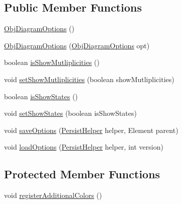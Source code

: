 \subsection*{Public Member Functions}
\begin{DoxyCompactItemize}
\item 
\hyperlink{classorg_1_1tzi_1_1use_1_1gui_1_1views_1_1diagrams_1_1objectdiagram_1_1_obj_diagram_options_addb90915073c67b043c6b73b29da1279}{Obj\-Diagram\-Options} ()
\item 
\hyperlink{classorg_1_1tzi_1_1use_1_1gui_1_1views_1_1diagrams_1_1objectdiagram_1_1_obj_diagram_options_a6ea32929afcb109c3407174860d71ddf}{Obj\-Diagram\-Options} (\hyperlink{classorg_1_1tzi_1_1use_1_1gui_1_1views_1_1diagrams_1_1objectdiagram_1_1_obj_diagram_options}{Obj\-Diagram\-Options} opt)
\item 
boolean \hyperlink{classorg_1_1tzi_1_1use_1_1gui_1_1views_1_1diagrams_1_1objectdiagram_1_1_obj_diagram_options_a71dbe252858720024859df34b5e86725}{is\-Show\-Mutliplicities} ()
\item 
void \hyperlink{classorg_1_1tzi_1_1use_1_1gui_1_1views_1_1diagrams_1_1objectdiagram_1_1_obj_diagram_options_a9e06187a385b7f14a2011060597c7819}{set\-Show\-Mutliplicities} (boolean show\-Mutliplicities)
\item 
boolean \hyperlink{classorg_1_1tzi_1_1use_1_1gui_1_1views_1_1diagrams_1_1objectdiagram_1_1_obj_diagram_options_a25db1b9e788d7ea31d926c1d6ed74e5f}{is\-Show\-States} ()
\item 
void \hyperlink{classorg_1_1tzi_1_1use_1_1gui_1_1views_1_1diagrams_1_1objectdiagram_1_1_obj_diagram_options_acb91b7218f9450ce310e9effc801311e}{set\-Show\-States} (boolean is\-Show\-States)
\item 
void \hyperlink{classorg_1_1tzi_1_1use_1_1gui_1_1views_1_1diagrams_1_1objectdiagram_1_1_obj_diagram_options_a176bcd8a82f2c8768e134767d28853ea}{save\-Options} (\hyperlink{classorg_1_1tzi_1_1use_1_1gui_1_1util_1_1_persist_helper}{Persist\-Helper} helper, Element parent)
\item 
void \hyperlink{classorg_1_1tzi_1_1use_1_1gui_1_1views_1_1diagrams_1_1objectdiagram_1_1_obj_diagram_options_a41ecd87e5bb7861acda41524b716fb0f}{load\-Options} (\hyperlink{classorg_1_1tzi_1_1use_1_1gui_1_1util_1_1_persist_helper}{Persist\-Helper} helper, int version)
\end{DoxyCompactItemize}
\subsection*{Protected Member Functions}
\begin{DoxyCompactItemize}
\item 
void \hyperlink{classorg_1_1tzi_1_1use_1_1gui_1_1views_1_1diagrams_1_1objectdiagram_1_1_obj_diagram_options_a40d9c942ad0d91d25b7567d8e602ef20}{register\-Additional\-Colors} ()
\end{DoxyCompactItemize}
